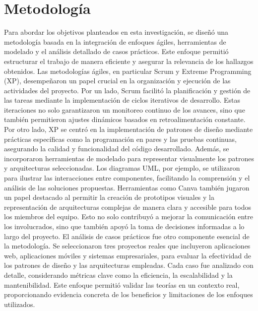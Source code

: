 \documentclass[conference]{IEEEtran}
\begin{document}
\section{Metodolog\'ia}
Para abordar los objetivos planteados en esta investigación, se diseñó una metodología basada en la integración de enfoques ágiles, herramientas de modelado y el análisis detallado de casos prácticos. Este enfoque permitió estructurar el trabajo de manera eficiente y asegurar la relevancia de los hallazgos obtenidos. 
Las metodologías ágiles, en particular Scrum y Extreme Programming (XP), desempeñaron un papel crucial en la organización y ejecución de las actividades del proyecto. Por un lado, Scrum facilitó la planificación y gestión de las tareas mediante la implementación de ciclos iterativos de desarrollo. Estas iteraciones no solo garantizaron un monitoreo continuo de los avances, sino que también permitieron ajustes dinámicos basados en retroalimentación constante. Por otro lado, XP se centró en la implementación de patrones de diseño mediante prácticas específicas como la programación en pares y las pruebas continuas, asegurando la calidad y funcionalidad del código desarrollado.
Además, se incorporaron herramientas de modelado para representar visualmente los patrones y arquitecturas seleccionadas. Los diagramas UML, por ejemplo, se utilizaron para ilustrar las interacciones entre componentes, facilitando la comprensión y el análisis de las soluciones propuestas. Herramientas como Canva también jugaron un papel destacado al permitir la creación de prototipos visuales y la representación de arquitecturas complejas de manera clara y accesible para todos los miembros del equipo. Esto no solo contribuyó a mejorar la comunicación entre los involucrados, sino que también apoyó la toma de decisiones informadas a lo largo del proyecto.
El análisis de casos prácticos fue otro componente esencial de la metodología. Se seleccionaron tres proyectos reales que incluyeron aplicaciones web, aplicaciones móviles y sistemas empresariales, para evaluar la efectividad de los patrones de diseño y las arquitecturas empleadas. Cada caso fue analizado con detalle, considerando métricas clave como la eficiencia, la escalabilidad y la mantenibilidad. Este enfoque permitió validar las teorías en un contexto real, proporcionando evidencia concreta de los beneficios y limitaciones de los enfoques utilizados.
\end{document}
